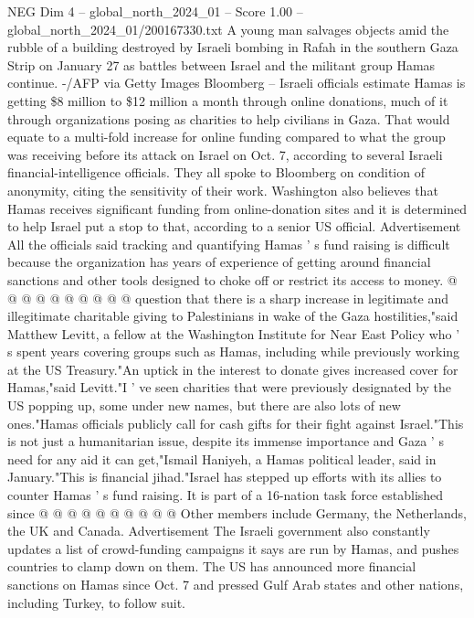 \begin{textsample}{NEG Dim 4 – global\_north\_2024\_01 – Score 1.00 – global\_north\_2024\_01/200167330.txt}  \label{ex:f4_neg_114}
A young man salvages objects amid the rubble of a building destroyed by Israeli bombing in Rafah in the southern Gaza Strip on January 27 as battles between Israel and the militant group Hamas continue. -/AFP via Getty Images Bloomberg -- Israeli officials estimate Hamas is getting \$8 million to \$12 million a month through online donations, much of it through organizations posing as charities to help civilians in Gaza.
That would equate to a multi-fold increase for online funding compared to what the group was receiving before its attack on Israel on Oct. 7, according to several Israeli financial-intelligence officials.
They all spoke to Bloomberg on condition of anonymity, citing the sensitivity of their work.
Washington also believes that Hamas receives significant funding from online-donation sites and it is determined to help Israel put a stop to that, according to a senior US official.
Advertisement All the officials said tracking and quantifying Hamas ' s fund raising is difficult because the organization has years of experience of getting around financial sanctions and other tools designed to choke off or restrict its access to money. @ @ @ @ @ @ @ @ @ @ question that there is a sharp increase in legitimate and illegitimate charitable giving to Palestinians in wake of the Gaza hostilities,"said Matthew Levitt, a fellow at the Washington Institute for Near East Policy who ' s spent years covering groups such as Hamas, including while previously working at the US Treasury."An uptick in the interest to donate gives increased cover for Hamas,"said Levitt."I ' ve seen charities that were previously designated by the US popping up, some under new names, but there are also lots of new ones."Hamas officials publicly call for cash gifts for their fight against Israel."This is not just a humanitarian issue, despite its immense importance and Gaza ' s need for any aid it can get,"Ismail Haniyeh, a Hamas political leader, said in January."This is financial jihad."Israel has stepped up efforts with its allies to counter Hamas ' s fund raising.
It is part of a 16-nation task force established since @ @ @ @ @ @ @ @ @ @ Other members include Germany, the Netherlands, the UK and Canada.
Advertisement The Israeli government also constantly updates a list of crowd-funding campaigns it says are run by Hamas, and pushes countries to clamp down on them.
The US has announced more financial sanctions on Hamas since Oct. 7 and pressed Gulf Arab states and other nations, including Turkey, to follow suit.

\end{textsample}
